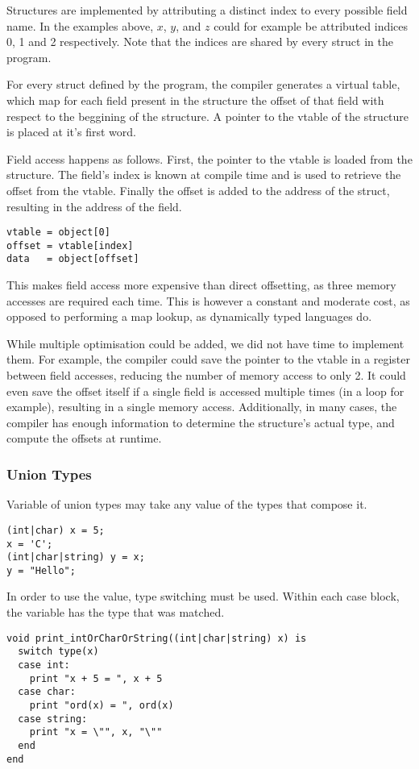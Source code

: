\documentclass{article}
\begin{document}
Structures are implemented by attributing a distinct index to every possible field name. In the examples
above, $x$, $y$, and $z$ could for example be attributed indices 0, 1 and 2 respectively.
Note that the indices are shared by every struct in the program.

For every struct defined by the program, the compiler generates a virtual table, which map for each field
present in the structure the offset of that field with respect to the beggining of the structure.
A pointer to the vtable of the structure is placed at it's first word.

Field access happens as follows. First, the pointer to the vtable is loaded from the structure. The field's
index is known at compile time and is used to retrieve the offset from the vtable. Finally the offset is
added to the address of the struct, resulting in the address of the field.

\begin{lstlisting}
vtable = object[0]
offset = vtable[index]
data   = object[offset]
\end{lstlisting}

This makes field access more expensive than direct offsetting, as three memory accesses are required each time.
This is however a constant and moderate cost, as opposed to performing a map lookup, as dynamically typed languages do.

While multiple optimisation could be added, we did not have time to implement them.
For example, the compiler could save the pointer to the vtable in a register between field accesses, reducing the
number of memory access to only 2. It could even save the offset itself if a single field is accessed multiple
times (in a loop for example), resulting in a single memory access. Additionally, in many cases, the compiler
has enough information to determine the structure's actual type, and compute the offsets at runtime.

\subsubsection{Union Types}
Variable of union types may take any value of the types that compose it.
\begin{lstlisting}
(int|char) x = 5;
x = 'C';
(int|char|string) y = x;
y = "Hello";
\end{lstlisting}

In order to use the value, type switching must be used. Within each case block, the variable has the type that was
matched.
\begin{lstlisting}
void print_intOrCharOrString((int|char|string) x) is
  switch type(x)
  case int:
    print "x + 5 = ", x + 5
  case char:
    print "ord(x) = ", ord(x)
  case string:
    print "x = \"", x, "\""
  end
end
\end{lstlisting}
\end{document}

